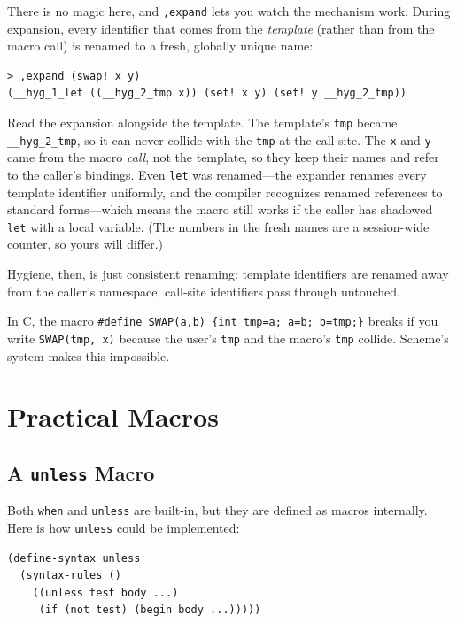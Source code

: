 There is no magic here, and \texttt{,expand} lets you watch the mechanism work. During expansion, every identifier that comes from the \emph{template} (rather than from the macro call) is renamed to a fresh, globally unique name:

\begin{lstlisting}[style=repl]
> ,expand (swap! x y)
(__hyg_1_let ((__hyg_2_tmp x)) (set! x y) (set! y __hyg_2_tmp))
\end{lstlisting}

Read the expansion alongside the template. The template's \texttt{tmp} became \texttt{\_\_hyg\_2\_tmp}, so it can never collide with the \texttt{tmp} at the call site. The \texttt{x} and \texttt{y} came from the macro \emph{call}, not the template, so they keep their names and refer to the caller's bindings. Even \texttt{let} was renamed---the expander renames every template identifier uniformly, and the compiler recognizes renamed references to standard forms---which means the macro still works if the caller has shadowed \texttt{let} with a local variable. (The numbers in the fresh names are a session-wide counter, so yours will differ.)

Hygiene, then, is just consistent renaming: template identifiers are renamed away from the caller's namespace, call-site identifiers pass through untouched. 

\begin{note}
In C, the macro \texttt{\#define SWAP(a,b) \{int tmp=a; a=b; b=tmp;\}} breaks if you write \texttt{SWAP(tmp, x)} because the user's \texttt{tmp} and the macro's \texttt{tmp} collide. Scheme's system makes this impossible.
\end{note}

\section{Practical Macros}

\subsection{A \texttt{unless} Macro}

Both \texttt{when} and \texttt{unless} are built-in, but they are defined as macros internally. Here is how \texttt{unless} could be implemented:

\begin{lstlisting}
(define-syntax unless
  (syntax-rules ()
    ((unless test body ...)
     (if (not test) (begin body ...)))))
\end{lstlisting}

